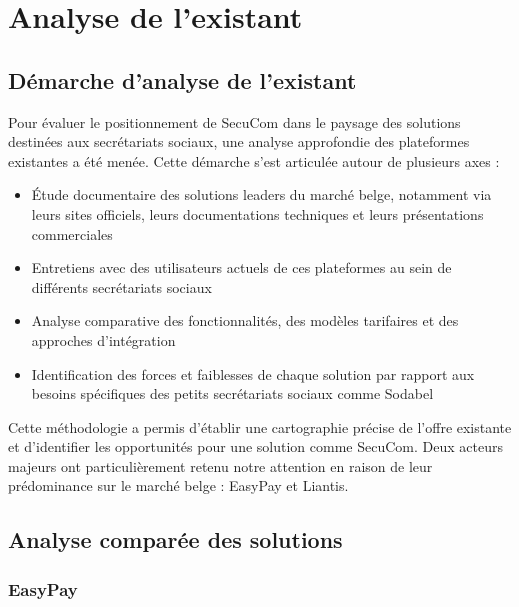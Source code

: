 \documentclass[12pt,a4paper]{report}
\begin{document}
\chapter{Analyse de l'existant}

\section{Démarche d'analyse de l'existant}

Pour évaluer le positionnement de SecuCom dans le paysage des solutions destinées aux secrétariats sociaux, une analyse approfondie des plateformes existantes a été menée. Cette démarche s'est articulée autour de plusieurs axes :

\begin{itemize}
  \item Étude documentaire des solutions leaders du marché belge, notamment via leurs sites officiels, leurs documentations techniques et leurs présentations commerciales
  \item Entretiens avec des utilisateurs actuels de ces plateformes au sein de différents secrétariats sociaux
  \item Analyse comparative des fonctionnalités, des modèles tarifaires et des approches d'intégration
  \item Identification des forces et faiblesses de chaque solution par rapport aux besoins spécifiques des petits secrétariats sociaux comme Sodabel
\end{itemize}

Cette méthodologie a permis d'établir une cartographie précise de l'offre existante et d'identifier les opportunités pour une solution comme SecuCom. Deux acteurs majeurs ont particulièrement retenu notre attention en raison de leur prédominance sur le marché belge : EasyPay et Liantis.

\section{Analyse comparée des solutions}

\subsection{EasyPay}

\end{document}
